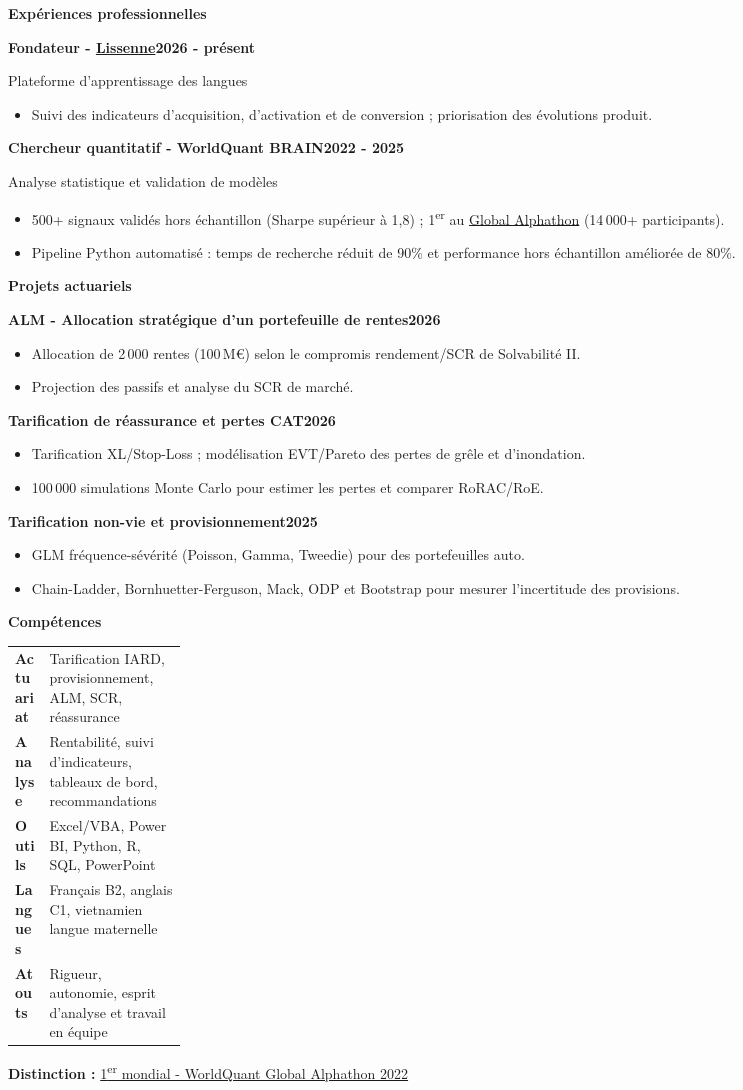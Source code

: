 \documentclass[a4paper,10pt]{article}
\newcommand{\cvsection}[1]{%
  \vspace{4pt}%
  {\color{cvblue}\fontsize{14}{16}\selectfont\bfseries #1}\par
  \vspace{-2pt}{\color{cvblue}\rule{0.28\linewidth}{0.6pt}}\par\vspace{1pt}
}
\newcommand{\cventry}[3]{%
  \textbf{#1}\hfill\textbf{#2}\par
  {\normalfont\color{black}#3}\par
}
\newcommand{\projectentry}[3]{%
  \textbf{#1}\hfill\textbf{#2}\par
  \begin{itemize}#3\end{itemize}
}
\begin{document}
\cvsection{Expériences professionnelles}
\cventry{Fondateur - \href{https://lissenne.com/}{Lissenne}}{2026 - présent}{Plateforme d'apprentissage des langues}
\begin{itemize}
  \item Suivi des indicateurs d'acquisition, d'activation et de conversion ; priorisation des évolutions produit.
\end{itemize}
\vspace{1pt}
\cventry{Chercheur quantitatif - WorldQuant BRAIN}{2022 - 2025}{Analyse statistique et validation de modèles}
\begin{itemize}
  \item 500+ signaux validés hors échantillon (Sharpe supérieur à 1,8) ; 1\textsuperscript{er} au \href{https://www.facebook.com/WorldQuantCareers/posts/worldquant-brains-2022-global-alphathon-is-complete-in-the-inaugural-quant-compe/2103386076520845/}{\textcolor{cvblue}{Global Alphathon}} (14\,000+ participants).
  \item Pipeline Python automatisé : temps de recherche réduit de 90\% et performance hors échantillon améliorée de 80\%.
\end{itemize}

\cvsection{Projets actuariels}
\projectentry{ALM - Allocation stratégique d'un portefeuille de rentes}{2026}{
  \item Allocation de 2\,000 rentes (100\,M€) selon le compromis rendement/SCR de Solvabilité II.
  \item Projection des passifs et analyse du SCR de marché.
}
\vspace{1pt}
\projectentry{Tarification de réassurance et pertes CAT}{2026}{
  \item Tarification XL/Stop-Loss ; modélisation EVT/Pareto des pertes de grêle et d'inondation.
  \item 100\,000 simulations Monte Carlo pour estimer les pertes et comparer RoRAC/RoE.
}
\vspace{1pt}
\projectentry{Tarification non-vie et provisionnement}{2025}{
  \item GLM fréquence-sévérité (Poisson, Gamma, Tweedie) pour des portefeuilles auto.
  \item Chain-Ladder, Bornhuetter-Ferguson, Mack, ODP et Bootstrap pour mesurer l'incertitude des provisions.
}

\cvsection{Compétences}
\begin{tabularx}{\linewidth}{@{}>{\bfseries}p{0.2\linewidth}X@{}}
Actuariat & Tarification IARD, provisionnement, ALM, SCR, réassurance \\
Analyse & Rentabilité, suivi d'indicateurs, tableaux de bord, recommandations \\
Outils & Excel/VBA, Power BI, Python, R, SQL, PowerPoint \\
Langues & Français B2, anglais C1, vietnamien langue maternelle \\
Atouts & Rigueur, autonomie, esprit d'analyse et travail en équipe
\end{tabularx}

\vspace{2pt}
\textbf{Distinction :} \href{https://www.facebook.com/WorldQuantCareers/posts/worldquant-brains-2022-global-alphathon-is-complete-in-the-inaugural-quant-compe/2103386076520845/}{\textcolor{cvblue}{1\textsuperscript{er} mondial - WorldQuant Global Alphathon 2022}}
\end{document}
